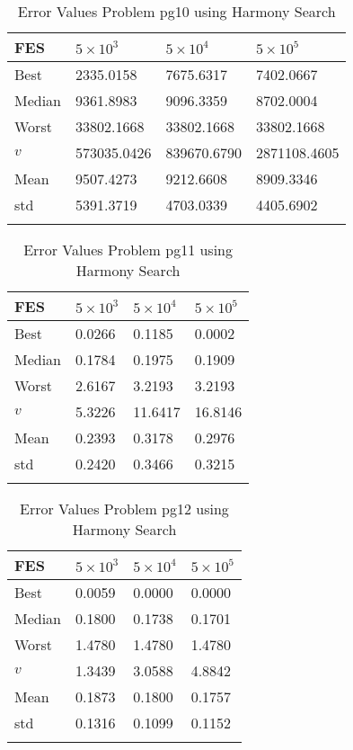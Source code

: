 \documentclass[10pt, a4paper]{book}
\begin{document}
\begin{center}
\begin{longtable}{l l l l}
FES & $5 \times 10^{3}$ & $5 \times 10^{4}$ & $5 \times 10^{5}$ \\
\hline
Best & 2335.0158 & 7675.6317 & 7402.0667 \\
Median & 9361.8983 & 9096.3359 & 8702.0004 \\
Worst & 33802.1668 & 33802.1668 & 33802.1668 \\
$v$ & 573035.0426 & 839670.6790 & 2871108.4605 \\
Mean & 9507.4273 & 9212.6608 & 8909.3346 \\
std & 5391.3719 & 4703.0339 & 4405.6902 \\
\caption{ Error Values Problem pg10 using Harmony Search }
\end{longtable}
\end{center}

\begin{center}
\begin{longtable}{l l l l}
FES & $5 \times 10^{3}$ & $5 \times 10^{4}$ & $5 \times 10^{5}$ \\
\hline
Best & 0.0266 & 0.1185 & 0.0002 \\
Median & 0.1784 & 0.1975 & 0.1909 \\
Worst & 2.6167 & 3.2193 & 3.2193 \\
$v$ & 5.3226 & 11.6417 & 16.8146 \\
Mean & 0.2393 & 0.3178 & 0.2976 \\
std & 0.2420 & 0.3466 & 0.3215 \\
\caption{ Error Values Problem pg11 using Harmony Search }
\end{longtable}
\end{center}

\begin{center}
\begin{longtable}{l l l l}
FES & $5 \times 10^{3}$ & $5 \times 10^{4}$ & $5 \times 10^{5}$ \\
\hline
Best & 0.0059 & 0.0000 & 0.0000 \\
Median & 0.1800 & 0.1738 & 0.1701 \\
Worst & 1.4780 & 1.4780 & 1.4780 \\
$v$ & 1.3439 & 3.0588 & 4.8842 \\
Mean & 0.1873 & 0.1800 & 0.1757 \\
std & 0.1316 & 0.1099 & 0.1152 \\
\caption{ Error Values Problem pg12 using Harmony Search }
\end{longtable}
\end{center}
\end{document}
